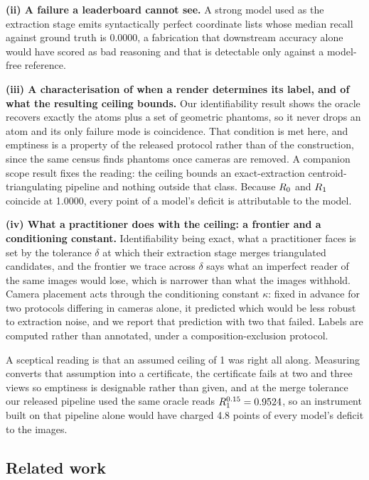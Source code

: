 \textbf{(ii) A failure a leaderboard cannot see.} A strong model used as the extraction stage emits
syntactically perfect coordinate lists whose median recall against ground truth is 0.0000, a fabrication that
downstream accuracy alone would have scored as bad reasoning and that is detectable only against a model-free
reference.

\textbf{(iii) A characterisation of when a render determines its label, and of what the resulting ceiling
bounds.} Our identifiability result shows the oracle recovers exactly the atoms plus a set of geometric
phantoms, so it never drops an atom and its only failure mode is coincidence. That condition is met here, and
emptiness is a property of the released protocol rather than of the construction, since the same census finds
phantoms once cameras are removed. A companion scope result fixes the reading: the ceiling bounds an
exact-extraction centroid-triangulating pipeline and nothing outside that class. Because $R_0$ and $R_1$
coincide at 1.0000, every point of a model's deficit is attributable to the model.

\textbf{(iv) What a practitioner does with the ceiling: a frontier and a conditioning constant.}
Identifiability being exact, what a practitioner faces is set by the tolerance $\delta$ at which their
extraction stage merges triangulated candidates, and the frontier we trace across $\delta$ says what an
imperfect reader of the same images would lose, which is narrower than what the images withhold. Camera
placement acts through the conditioning constant $\kappa$: fixed in advance for two protocols differing in
cameras alone, it predicted which would be less robust to extraction noise, and we report that prediction with two
that failed. Labels are computed rather than annotated, under a composition-exclusion protocol.

A sceptical reading is that an assumed ceiling of 1 was right all along. Measuring converts that assumption
into a certificate, the certificate fails at two and three views so emptiness is designable rather than given,
and at the merge tolerance our released pipeline used the same oracle reads $R_1^{0.15} = 0.9524$, so an
instrument built on that pipeline alone would have charged 4.8 points of every model's deficit to the
images.

\subsection{Related work}
\label{sec:related}

